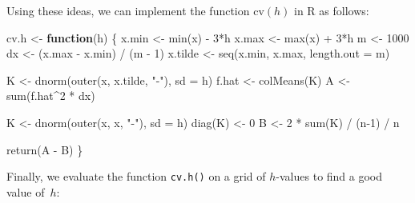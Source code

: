\documentclass[
  a4paper,
]{article}
\newenvironment{Shaded}{\begin{snugshade}}{\end{snugshade}}
\newcommand{\AttributeTok}[1]{\textcolor[rgb]{0.77,0.63,0.00}{#1}}
\newcommand{\ControlFlowTok}[1]{\textcolor[rgb]{0.13,0.29,0.53}{\textbf{#1}}}
\newcommand{\DecValTok}[1]{\textcolor[rgb]{0.00,0.00,0.81}{#1}}
\newcommand{\FunctionTok}[1]{\textcolor[rgb]{0.00,0.00,0.00}{#1}}
\newcommand{\NormalTok}[1]{#1}
\newcommand{\OtherTok}[1]{\textcolor[rgb]{0.56,0.35,0.01}{#1}}
\newcommand{\SpecialCharTok}[1]{\textcolor[rgb]{0.00,0.00,0.00}{#1}}
\newcommand{\StringTok}[1]{\textcolor[rgb]{0.31,0.60,0.02}{#1}}
\theoremstyle{definition}
\theoremstyle{definition}
\theoremstyle{definition}
\theoremstyle{definition}
\theoremstyle{remark}
\begin{document}
Using these ideas, we can implement the function \(\mathrm{cv}(h)\)
in R as follows:

\begin{Shaded}
\begin{Highlighting}[]
\NormalTok{cv.h }\OtherTok{\textless{}{-}} \ControlFlowTok{function}\NormalTok{(h) \{}
\NormalTok{    x.min }\OtherTok{\textless{}{-}} \FunctionTok{min}\NormalTok{(x) }\SpecialCharTok{{-}} \DecValTok{3}\SpecialCharTok{*}\NormalTok{h}
\NormalTok{    x.max }\OtherTok{\textless{}{-}} \FunctionTok{max}\NormalTok{(x) }\SpecialCharTok{+} \DecValTok{3}\SpecialCharTok{*}\NormalTok{h}
\NormalTok{    m }\OtherTok{\textless{}{-}} \DecValTok{1000}
\NormalTok{    dx }\OtherTok{\textless{}{-}}\NormalTok{ (x.max }\SpecialCharTok{{-}}\NormalTok{ x.min) }\SpecialCharTok{/}\NormalTok{ (m }\SpecialCharTok{{-}} \DecValTok{1}\NormalTok{)}
\NormalTok{    x.tilde }\OtherTok{\textless{}{-}} \FunctionTok{seq}\NormalTok{(x.min, x.max, }\AttributeTok{length.out =}\NormalTok{ m)}

\NormalTok{    K }\OtherTok{\textless{}{-}} \FunctionTok{dnorm}\NormalTok{(}\FunctionTok{outer}\NormalTok{(x, x.tilde, }\StringTok{"{-}"}\NormalTok{), }\AttributeTok{sd =}\NormalTok{ h)}
\NormalTok{    f.hat }\OtherTok{\textless{}{-}} \FunctionTok{colMeans}\NormalTok{(K)}
\NormalTok{    A }\OtherTok{\textless{}{-}} \FunctionTok{sum}\NormalTok{(f.hat}\SpecialCharTok{\^{}}\DecValTok{2} \SpecialCharTok{*}\NormalTok{ dx)}

\NormalTok{    K }\OtherTok{\textless{}{-}} \FunctionTok{dnorm}\NormalTok{(}\FunctionTok{outer}\NormalTok{(x, x, }\StringTok{"{-}"}\NormalTok{), }\AttributeTok{sd =}\NormalTok{ h)}
    \FunctionTok{diag}\NormalTok{(K) }\OtherTok{\textless{}{-}} \DecValTok{0}
\NormalTok{    B }\OtherTok{\textless{}{-}} \DecValTok{2} \SpecialCharTok{*} \FunctionTok{sum}\NormalTok{(K) }\SpecialCharTok{/}\NormalTok{ (n}\DecValTok{{-}1}\NormalTok{) }\SpecialCharTok{/}\NormalTok{ n}

    \FunctionTok{return}\NormalTok{(A }\SpecialCharTok{{-}}\NormalTok{ B)}
\NormalTok{\}}
\end{Highlighting}
\end{Shaded}

Finally, we evaluate the function \texttt{cv.h()} on a grid of \(h\)-values
to find a good value of~\(h\):
\end{document}
